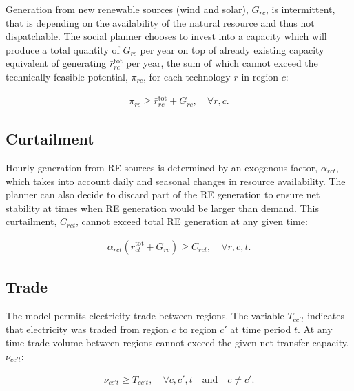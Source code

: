 \documentclass[authoryear]{elsarticle}
\begin{document}
Generation from new renewable sources (wind and solar), $G_{rc}$, is intermittent, that is depending on the availability of the natural resource and thus not dispatchable. The social planner chooses to invest into a capacity which will produce a total quantity of $G_{rc}$ per year on top of already existing capacity equivalent of generating $\bar{r}^\mathrm{tot}_{rc}$ per year, the sum of
which cannot exceed the technically feasible potential, $\pi_{rc}$, for each technology $r$ in region $c$:

\begin{align}
\pi_{rc} \geq \bar{r}_{rc}^\mathrm{tot} + G_{rc}, \quad \forall r,c. \label{eq:mkt_inv}
\end{align}

\subsection{Curtailment} 
Hourly generation from RE sources is determined by an exogenous factor, $\alpha_{rct}$, which takes into account daily and seasonal changes in resource availability. The planner can also decide to discard part of the RE generation to ensure net stability at times when RE generation would be larger than demand. This curtailment, $C_{rct}$, cannot exceed total RE generation at any given time:

\begin{align}
\alpha_{rct}\left( \bar{r}^\mathrm{tot}_{ct} + G_{rc} \right) \geq C_{rct}, \quad \forall r,c,t. \label{eq:mkt_cur}
\end{align} 

\subsection{Trade}
The model permits electricity trade between regions. The variable $T_{cc't}$ indicates that electricity was traded from region $c$ to region $c'$ at time period $t$. At any time trade volume between regions cannot exceed the given net transfer capacity, $\nu_{cc't}$:

\begin{align}
\nu_{cc't} \geq T_{cc't}, \quad \forall c,c',t \quad \mathrm{and} \quad c \neq c'. \label{eq:mkt_trade}
\end{align}

\end{document}
